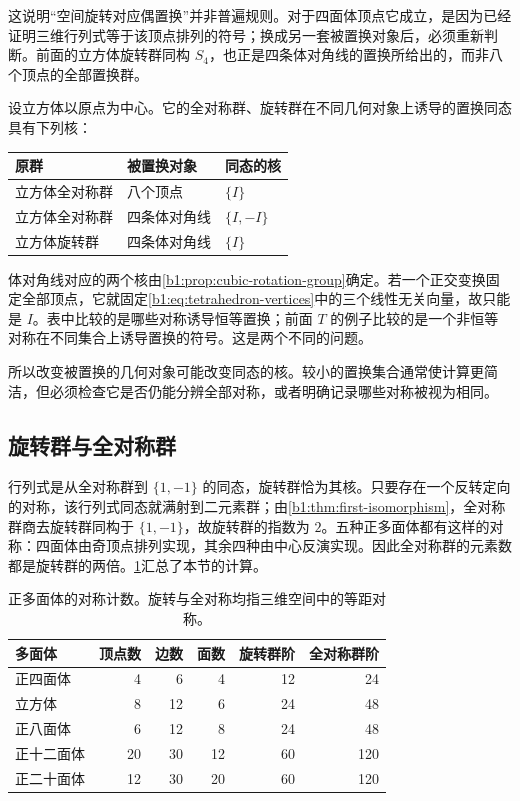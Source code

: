 \ProseParagraphBreak
这说明“空间旋转对应偶置换”并非普遍规则。对于四面体顶点它成立，是因为已经证明三维行列式等于该顶点排列的符号；换成另一套被置换对象后，必须重新判断。前面的立方体旋转群同构 \(S_4\)，也正是四条体对角线的置换所给出的，而非八个顶点的全部置换群。

\begin{remark}[同一几何群的不同置换模型]\label{b1:prop:cube-lines-kernel}
	设立方体以原点为中心。它的全对称群、旋转群在不同几何对象上诱导的置换同态具有下列核：
	\begin{center}
		\begin{tabular}{lll}
			\toprule
			原群 & 被置换对象 & 同态的核 \\
			\midrule
			立方体全对称群 & 八个顶点 & \(\{I\}\) \\
			立方体全对称群 & 四条体对角线 & \(\{I,-I\}\) \\
			立方体旋转群 & 四条体对角线 & \(\{I\}\) \\
			\bottomrule
		\end{tabular}
	\end{center}
	体对角线对应的两个核由\cref{b1:prop:cubic-rotation-group}确定。若一个正交变换固定全部顶点，它就固定\eqref{b1:eq:tetrahedron-vertices}中的三个线性无关向量，故只能是 \(I\)。表中比较的是哪些对称诱导恒等置换；前面 \(T\) 的例子比较的是一个非恒等对称在不同集合上诱导置换的符号。这是两个不同的问题。
\end{remark}

所以改变被置换的几何对象可能改变同态的核。较小的置换集合通常使计算更简洁，但必须检查它是否仍能分辨全部对称，或者明确记录哪些对称被视为相同。

\subsection{旋转群与全对称群}
\label{b1:subsec:0304:03}

行列式是从全对称群到 \(\{1,-1\}\) 的同态，旋转群恰为其核。只要存在一个反转定向的对称，该行列式同态就满射到二元素群；由\cref{b1:thm:first-isomorphism}，全对称群商去旋转群同构于 \(\{1,-1\}\)，故旋转群的指数为 \(2\)。五种正多面体都有这样的对称：四面体由奇顶点排列实现，其余四种由中心反演实现。因此全对称群的元素数都是旋转群的两倍。\cref{b1:tab:regular-polyhedra}汇总了本节的计算。

\begin{table}[htbp]
	\centering
	\caption[正多面体的对称计数]{正多面体的对称计数。旋转与全对称均指三维空间中的等距对称。}
	\label{b1:tab:regular-polyhedra}
	\begin{tabular}{lrrrrr}
		\toprule
		多面体 & 顶点数 & 边数 & 面数 & 旋转群阶 & 全对称群阶 \\
		\midrule
		正四面体 & 4 & 6 & 4 & 12 & 24 \\
		立方体 & 8 & 12 & 6 & 24 & 48 \\
		正八面体 & 6 & 12 & 8 & 24 & 48 \\
		正十二面体 & 20 & 30 & 12 & 60 & 120 \\
		正二十面体 & 12 & 30 & 20 & 60 & 120 \\
		\bottomrule
	\end{tabular}
\end{table}

